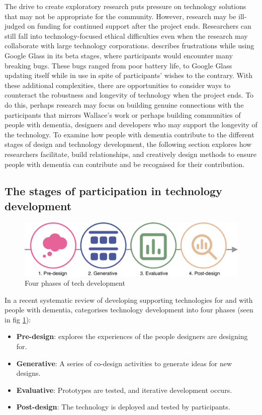 The drive to create exploratory research puts pressure on technology solutions that may not be appropriate for the community. However, research may be ill-judged on funding for continued support after the project ends. Researchers can still fall into technology-focused ethical difficulties even when the research may collaborate with large technology corporations. \cite{vines_our_2017} describes frustrations while using Google Glass in its beta stages, where participants would encounter many breaking bugs. These bugs ranged from poor battery life, to Google Glass updating itself while in use in spite of participants' wishes to the contrary. With these additional complexities, there are opportunities to consider ways to counteract the robustness and longevity of technology when the project ends. To do this, perhaps research may focus on building genuine connections with the participants that mirrors Wallace's work or perhaps building communities of people with dementia, designers and developers who may support the longevity of the technology. To examine how people with dementia contribute to the different stages of design and technology development, the following section explores how researchers facilitate, build relationships, and creatively design methods to ensure people with dementia can contribute and be recognised for their contribution.
\subsection{The stages of participation in technology development}
\label{BL:StagesofTech}

\begin{figure}[htp]
    \centering
    \includegraphics[width=0.8\linewidth]{Images/ChapterTwo/PhasesOfTech.png}
    \caption{Four phases of tech development \citep{suijkerbuijk_active_2019}}
    \label{fig:PhasesOfTech}
\end{figure}
In a recent systematic review of developing supporting technologies for and with people with dementia, \cite{suijkerbuijk_active_2019} categorises technology development into four phases (seen in fig \ref{fig:PhasesOfTech}):

\begin{itemize}
    \item \textbf{Pre-design}: explores the experiences of the people designers are designing for.
    \item \textbf{Generative}: A series of co-design activities to generate ideas for new designs.
    \item \textbf{Evaluative}: Prototypes are tested, and iterative development occurs.
    \item \textbf{Post-design}: The technology is deployed and tested by participants.
\end{itemize}

